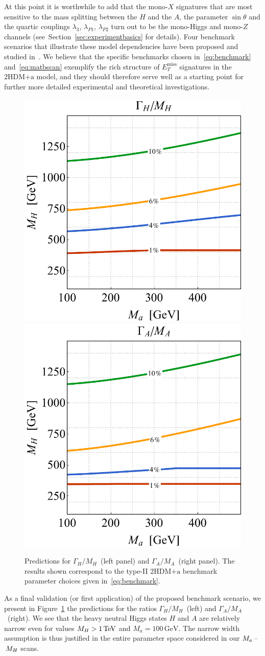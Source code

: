 \documentclass[review]{elsarticle}
\newcommand{\MET}{\ensuremath{E_T^\mathrm{miss}}\xspace}
\newcommand{\hdma}{\ensuremath{\textrm{2HDM+a}}\xspace}
\begin{document}
At this point it is worthwhile to add that the mono-$X$ signatures that are most sensitive to the mass splitting between the $H$ and the $A$, the parameter $\sin \theta$ and the quartic couplings $\lambda_{3}$, $\lambda_{P1}$, $\lambda_{P2}$ turn out to be  the mono-Higgs and mono-$Z$ channels (see~Section~\ref{sec:experimentbasics} for details). Four benchmark scenarios that illustrate these model dependencies have been proposed and studied in~\cite{Bauer:2017ota}.  We believe that the specific benchmarks  chosen in~\eqref{eq:benchmark} and~\eqref{eq:matbscan}   exemplify  the rich structure of $\MET$ signatures in the \hdma model, and they should therefore serve well as a starting point for further more detailed experimental and theoretical investigations. 

\begin{figure}[t!]
\centering
\includegraphics[height=.45\textwidth]{figure5l.pdf} \qquad 
\includegraphics[height=.45\textwidth]{figure5r.pdf}
\vspace{4mm}
\caption{\label{fig:Gammas}  Predictions for  $\Gamma_H/M_H$~(left panel) and $\Gamma_A/M_A$~(right panel). The results shown correspond to the type-II \hdma benchmark parameter choices given in~\eqref{eq:benchmark}.}
\end{figure}

As a final validation (or first application) of the proposed benchmark scenario, we present in  Figure~\ref{fig:Gammas} the predictions for the ratios $\Gamma_H/M_H$~(left) and $\Gamma_A/M_A$~(right). We see that the heavy neutral Higgs states $H$ and $A$ are relatively narrow even for values $M_H > 1 \, {\rm TeV}$ and $M_a = 100 \, {\mathrm{GeV}}$.  The narrow width assumption is thus justified in the entire parameter space considered in our $M_a\hspace{0.5mm}$--$\hspace{0.5mm}M_H$ scans. 
\end{document}
